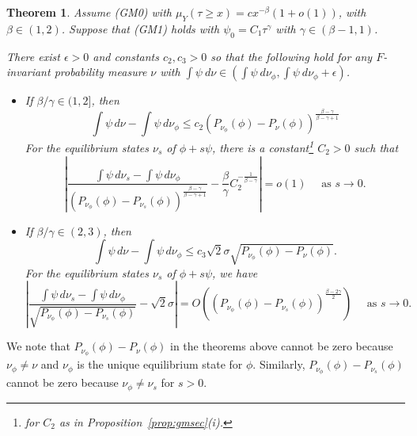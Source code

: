 \documentclass[12pt]{article}
\numberwithin{equation}{section}
\newtheorem{thm}{Theorem}[section]
\newcommand{\eps}{{\epsilon}}
\begin{document}
\begin{thm}\label{thm:secmain}Assume (GM0) with $\mu_Y(\tau\ge x)=c x^{-\beta}(1+o(1))$, with $\beta\in (1,2)$.
Suppose that (GM1) holds with $\psi_0=C_1 \tau^\gamma$ with $\gamma\in (\beta-1,1)$. 

There exist $\eps>0$ and constants $c_2, c_3>0$ so that the following hold for any $F$-invariant probability measure $\nu$ with $\int\psi~d\nu\in \left(\int\psi~d\nu_\phi, \int\psi~d\nu_\phi+\eps\right)$.
\begin{itemize}
 \item[(a)]  If $\beta/\gamma\in (1,2]$,
then
\[
 \int\psi\,d\nu-\int\psi\,d\nu_{\phi}\le c_2 (P_{\nu_\phi}(\phi)-P_\nu(\phi))^{\frac{\beta-\gamma}{\beta-\gamma+1}}
 \]
 For the equilibrium states $\nu_s$ of $\phi + s\psi$, there is a constant\footnote{for $C_2$ as in Proposition~\ref{prop:gmsec}(i).}
 $C_2>0$ such that
 \begin{equation}
\left| \frac{ \int\psi\,d\nu_s-\int\psi\,d\nu_{\phi}}{(P_{\nu_\phi}(\phi)-P_{\nu_s}(\phi))^{\frac{\beta-\gamma}{\beta-\gamma+1}} }
 - \frac{\beta}{\gamma} C_2^{-\frac{1}{\beta-\gamma}} \right| = o(1) \quad \text{ as } s \to 0.
 \label{eq:heavyHold}
 \end{equation}


\item[(b)] If $\beta/\gamma\in (2,3)$, then
\[
 \int\psi\,d\nu-\int\psi\,d\nu_{\phi}\le  c_3 {\sqrt 2}\sigma\sqrt{P_{\nu_\phi}(\phi)-P_\nu(\phi)}.
 \]
 For the equilibrium states $\nu_s$ of $\phi + s\psi$, we have
 \begin{equation}
\left| \frac{ \int\psi\,d\nu_s- \int\psi\,d\nu_{\phi}}{\sqrt{P_{\nu_\phi}(\phi)-P_{\nu_s}(\phi)}} - \sqrt2\sigma \right|
 = O\left((P_{\nu_\phi}(\phi)-P_{\nu_s}(\phi) )^{\frac{\beta-2\gamma}{2}}\right) \quad \text{ as } s \to 0.
 \label{eq:heavyquad}
 \end{equation}
\end{itemize}
\end{thm}
\begin{rmk}\label{rmk:nonzpt}
 We note that $P_{\nu_\phi}(\phi)-P_{\nu}(\phi)$ in the theorems above cannot be zero because $\nu_\phi\neq \nu$ and $\nu_\phi$ is the unique equilibrium state for $\phi$.  Similarly, $P_{\nu_\phi}(\phi)-P_{\nu_s}(\phi)$ cannot be zero because $\nu_\phi\neq \nu_s$ for $s>0$.
\end{rmk}
\end{document}
